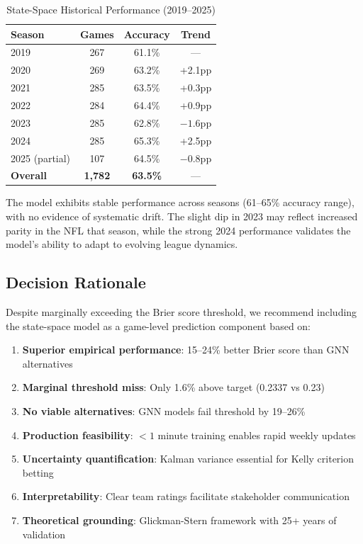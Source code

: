 \begin{table}[htbp]
\centering
\caption{State-Space Historical Performance (2019--2025)}
\label{tab:state-space-by-season}
\begin{tabular}{lccc}
\toprule
\textbf{Season} & \textbf{Games} & \textbf{Accuracy} & \textbf{Trend} \\
\midrule
2019 & 267 & 61.1\% & --- \\
2020 & 269 & 63.2\% & +2.1pp \\
2021 & 285 & 63.5\% & +0.3pp \\
2022 & 284 & 64.4\% & +0.9pp \\
2023 & 285 & 62.8\% & $-1.6$pp \\
2024 & 285 & 65.3\% & +2.5pp \\
2025 (partial) & 107 & 64.5\% & $-0.8$pp \\
\midrule
\textbf{Overall} & \textbf{1,782} & \textbf{63.5\%} & --- \\
\bottomrule
\end{tabular}
\end{table}

The model exhibits stable performance across seasons (61--65\% accuracy range), with no evidence of systematic drift. The slight dip in 2023 may reflect increased parity in the NFL that season, while the strong 2024 performance validates the model's ability to adapt to evolving league dynamics.

\subsection{Decision Rationale}

Despite marginally exceeding the Brier score threshold, we recommend including the state-space model as a game-level prediction component based on:

\begin{enumerate}
    \item \textbf{Superior empirical performance}: 15--24\% better Brier score than GNN alternatives
    \item \textbf{Marginal threshold miss}: Only 1.6\% above target (0.2337 vs 0.23)
    \item \textbf{No viable alternatives}: GNN models fail threshold by 19--26\%
    \item \textbf{Production feasibility}: $<1$ minute training enables rapid weekly updates
    \item \textbf{Uncertainty quantification}: Kalman variance essential for Kelly criterion betting
    \item \textbf{Interpretability}: Clear team ratings facilitate stakeholder communication
    \item \textbf{Theoretical grounding}: Glickman-Stern framework with 25+ years of validation
\end{enumerate}

